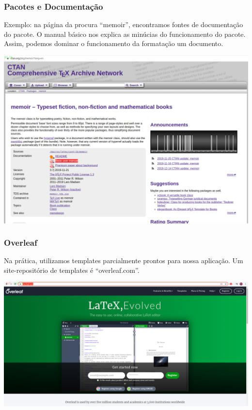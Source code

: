 \documentclass{beamer}
\begin{document}
\begin{frame}
  \frametitle{Pacotes e Documentação}
  \begin{tcolorbox}[fontupper=\fontsize{4mm}{4mm}, size=small]
    Exemplo: na página da procura ``memoir'', encontramos fontes de
    documentação do pacote. O manual básico nos explica as minúcias do
    funcionamento do pacote. Assim, podemos dominar o funcionamento da formatação
    um documento.
  \end{tcolorbox}

  \begin{center}
    \includegraphics[scale=0.16]{../Imagens/CTAN3.png}
  \end{center}

\end{frame}





\begin{frame}

  \frametitle{Overleaf}
  \begin{tcolorbox}[fontupper=\fontsize{3.7mm}{3.7mm}, size=small]
    Na prática, utilizamos templates parcialmente prontos para nossa
    aplicação. Um site-repositório de templates é ``overleaf.com''.
  \end{tcolorbox}
  \begin{center}
    \includegraphics[scale=0.17]{../Imagens/OVERL1.png}
  \end{center}


\end{frame}
\end{document}
